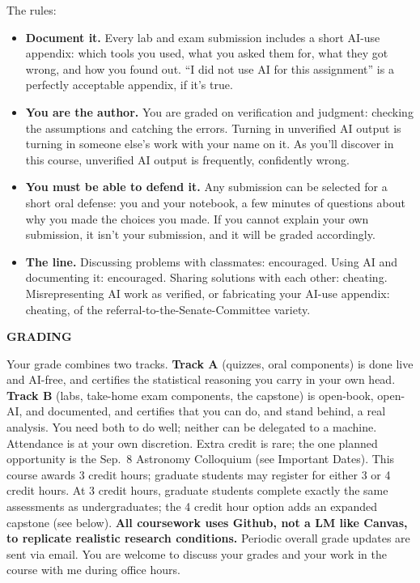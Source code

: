 The rules:
\begin{itemize}
    \setlength\itemsep{0.05em}
    \item {\bf Document it.} Every lab and exam submission includes a short AI-use
        appendix: which tools you used, what you asked them for, what they got
        wrong, and how you found out. ``I did not use AI for this assignment''
        is a perfectly acceptable appendix, if it's true.
    \item {\bf You are the author.} You are graded on verification and judgment:
        checking the assumptions and catching the errors. Turning in unverified AI output
        is turning in someone else's work with your name on it. As
        you'll discover in this course, unverified AI output is frequently,
        confidently wrong.
    \item {\bf You must be able to defend it.} Any submission can be selected
        for a short oral defense: you and your notebook, a few minutes of questions about why you made the choices you made. If you cannot
        explain your own submission, it isn't your submission, and it will be
        graded accordingly.
    \item {\bf The line.} Discussing problems with classmates: encouraged.
        Using AI and documenting it: encouraged. Sharing solutions with each
        other: cheating. Misrepresenting AI work as verified, or fabricating
        your AI-use appendix: cheating, of the referral-to-the-Senate-Committee
        variety.
\end{itemize}

{\large \bf \headerfont \color{RoyalBlue} GRADING}

Your grade combines two tracks. {\bf Track A} (quizzes, oral components) is
done live and AI-free, and certifies the statistical reasoning you carry in
your own head. {\bf Track B} (labs, take-home exam components, the capstone) is
open-book, open-AI, and documented, and certifies that you can do, and stand
behind, a real analysis. You need both to do well; neither can be delegated
to a machine. Attendance is at your own discretion. Extra credit is rare;
the one planned opportunity is the Sep.~8 Astronomy Colloquium (see Important
Dates). This course awards 3 credit hours; graduate students may register for either
3 or 4 credit hours. At 3 credit hours, graduate students complete exactly the
same assessments as undergraduates; the 4 credit hour option adds an expanded
capstone (see below). {\bf All
coursework uses Github, not a LM like Canvas, to replicate realistic research
conditions.} Periodic overall grade updates are sent via email. You are
welcome to discuss your grades and your work in the course with me during
office hours.\smallskip

